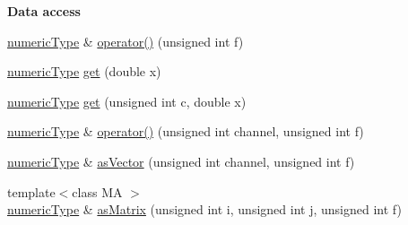 \begin{Indent}\textbf{ Data access}\par
\begin{DoxyCompactItemize}
\item 
\hyperlink{classtsa_1_1_seq_view_a72b689db78d0feea3305e62cc3852a1d}{numeric\+Type} \& \hyperlink{classtsa_1_1_seq_view_a59cc4be1619fb557ddadf7d0bf5cdcc6}{operator()} (unsigned int f)
\item 
\hyperlink{classtsa_1_1_seq_view_a72b689db78d0feea3305e62cc3852a1d}{numeric\+Type} \hyperlink{classtsa_1_1_seq_view_a78bd0e8b3e05e738f9d7d42f59212549}{get} (double x)
\item 
\hyperlink{classtsa_1_1_seq_view_a72b689db78d0feea3305e62cc3852a1d}{numeric\+Type} \hyperlink{classtsa_1_1_seq_view_a8d3b068d086682175e4b3ff63b54089d}{get} (unsigned int c, double x)
\item 
\hyperlink{classtsa_1_1_seq_view_a72b689db78d0feea3305e62cc3852a1d}{numeric\+Type} \& \hyperlink{classtsa_1_1_seq_view_ace64c1b40ce99c7905af99a0f5b1086f}{operator()} (unsigned int channel, unsigned int f)
\item 
\hyperlink{classtsa_1_1_seq_view_a72b689db78d0feea3305e62cc3852a1d}{numeric\+Type} \& \hyperlink{classtsa_1_1_seq_view_a25485658d75b5e9d06c34836541fbd85}{as\+Vector} (unsigned int channel, unsigned int f)
\item 
{\footnotesize template$<$class MA $>$ }\\\hyperlink{classtsa_1_1_seq_view_a72b689db78d0feea3305e62cc3852a1d}{numeric\+Type} \& \hyperlink{classtsa_1_1_seq_view_a336812c82ae6a5f415b9850295245fa6}{as\+Matrix} (unsigned int i, unsigned int j, unsigned int f)
\end{DoxyCompactItemize}
\end{Indent}

